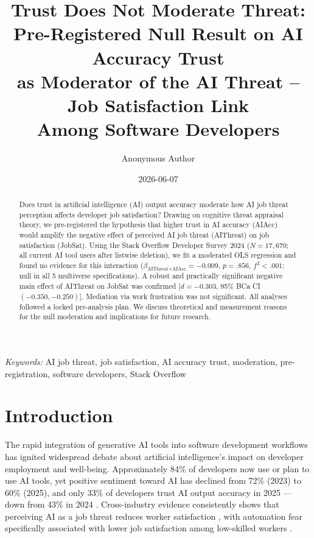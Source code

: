 \documentclass[11pt]{article}
\title{\textbf{Trust Does Not Moderate Threat:\\
Pre-Registered Null Result on AI Accuracy Trust\\
as Moderator of the AI Threat -- Job Satisfaction Link\\
Among Software Developers}}
\author{Anonymous Author}
\date{2026-06-07}
\begin{document}
\maketitle

\begin{abstract}
Does trust in artificial intelligence (AI) output accuracy moderate how AI job
threat perception affects developer job satisfaction? Drawing on cognitive threat
appraisal theory, we pre-registered the hypothesis that higher trust in AI
accuracy (AIAcc) would amplify the negative effect of perceived AI job threat
(AIThreat) on job satisfaction (JobSat). Using the Stack Overflow Developer
Survey 2024 ($N = 17{,}670$; all current AI tool users after listwise deletion),
we fit a moderated OLS regression and found no evidence for this interaction
($\beta_{\text{AIThreat} \times \text{AIAcc}} = -0.009$, $p = .856$, $f^2 <
.001$; null in all 5 multiverse specifications). A robust and practically
significant negative main effect of AIThreat on JobSat was confirmed [$d =
-0.303$, 95\% BCa CI $(-0.350, -0.250)$]. Mediation via work frustration was not
significant. All analyses followed a locked pre-analysis plan. We discuss
theoretical and measurement reasons for the null moderation and implications
for future research.
\end{abstract}

\textit{Keywords:} AI job threat, job satisfaction, AI accuracy trust, moderation, pre-registration, software developers, Stack Overflow

\vspace{0.3cm}

\section{Introduction}

The rapid integration of generative AI tools into software development workflows
has ignited widespread debate about artificial intelligence's impact on developer
employment and well-being. Approximately 84\% of developers now use or plan to use
AI tools, yet positive sentiment toward AI has declined from 72\% (2023) to 60\%
(2025), and only 33\% of developers trust AI output accuracy in 2025 --- down from
43\% in 2024 \citep{stackoverflow2024, stackoverflow2025}. Cross-industry evidence
consistently shows that perceiving AI as a job threat reduces worker satisfaction
\citep{schwabe2020automation, zhao2025impact}, with automation fear specifically
associated with lower job satisfaction among low-skilled workers \citep{schwabe2020automation}.
\end{document}
